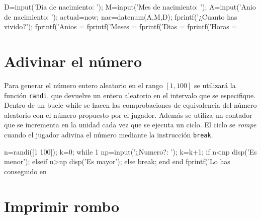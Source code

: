 \sol

\begin{matlab}
D=input('Día de nacimiento: ');
M=input('Mes de nacimiento: ');
A=input('Anio de nacimiento: ');
actual=now;
nac=datenum(A,M,D);
fprintf('\n¿Cuanto has vivido?\n');
fprintf('Anios = %
fprintf('Meses = %
fprintf('Dias = %
fprintf('Horas = %
\end{matlab}


\section{Adivinar el número}


\sol

Para generar el número entero aleatorio en el rango $[1,100]$ se utilizará la función \texttt{randi}, que devuelve un 
entero aleatorio en el intervalo que se especifique. Dentro de un bucle while se hacen las comprobaciones de equivalencia 
del número aleatorio con el número propuesto por el jugador. Además se utiliza un contador que se incrementa en la unidad 
cada vez que se ejecuta un ciclo. El ciclo se \textit{rompe} cuando el jugador adivina el número mediante la 
instrucción \texttt{break}.

\begin{matlab}
n=randi([1 100]);
k=0;
while 1
    np=input('¿Numero?: ');
    k=k+1;
    if n<np
        disp('Es menor');
    elseif n>np
        disp('Es mayor');
    else
        break;
    end
end
fprintf('Lo has conseguido en %
\end{matlab}

\section{Imprimir rombo} 

